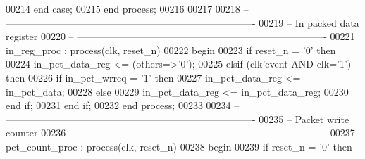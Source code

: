 \begin{DoxyCode}
00214     \textcolor{keywordflow}{end} \textcolor{keywordflow}{case};
00215 \textcolor{keywordflow}{end} \textcolor{keywordflow}{process};
00216 
00217 
00218 \textcolor{keyword}{-- ----------------------------------------------------------------------------}
00219 \textcolor{keyword}{-- In packed data register}
00220 \textcolor{keyword}{-- ----------------------------------------------------------------------------}
00221 in\_reg\_proc : \textcolor{keywordflow}{process}(clk, reset_n)
00222 \textcolor{vhdlkeyword}{begin}
00223    \textcolor{keywordflow}{if} \textcolor{vhdlchar}{reset_n} \textcolor{vhdlchar}{=} \textcolor{vhdlchar}{'}\textcolor{vhdllogic}{}\textcolor{vhdllogic}{0}\textcolor{vhdlchar}{'} \textcolor{keywordflow}{then} 
00224       \textcolor{vhdlchar}{in_pct_data_reg} \textcolor{vhdlchar}{<=} \textcolor{vhdlchar}{(}\textcolor{keywordflow}{others}\textcolor{vhdlchar}{=}\textcolor{vhdlchar}{>}\textcolor{vhdlchar}{'}\textcolor{vhdllogic}{}\textcolor{vhdllogic}{0}\textcolor{vhdlchar}{'}\textcolor{vhdlchar}{)};
00225    \textcolor{keywordflow}{elsif} \textcolor{vhdlchar}{(}\textcolor{vhdlchar}{clk}\textcolor{vhdlchar}{'}\textcolor{vhdlkeyword}{event} \textcolor{keywordflow}{AND} \textcolor{vhdlchar}{clk}\textcolor{vhdlchar}{=}\textcolor{vhdlchar}{'}\textcolor{vhdllogic}{}\textcolor{vhdllogic}{1}\textcolor{vhdlchar}{'}\textcolor{vhdlchar}{)} \textcolor{keywordflow}{then} 
00226       \textcolor{keywordflow}{if} \textcolor{vhdlchar}{in_pct_wrreq} \textcolor{vhdlchar}{=} \textcolor{vhdlchar}{'}\textcolor{vhdllogic}{}\textcolor{vhdllogic}{1}\textcolor{vhdlchar}{'} \textcolor{keywordflow}{then} 
00227          \textcolor{vhdlchar}{in_pct_data_reg} \textcolor{vhdlchar}{<=} \textcolor{vhdlchar}{in_pct_data};
00228       \textcolor{keywordflow}{else} 
00229          \textcolor{vhdlchar}{in_pct_data_reg} \textcolor{vhdlchar}{<=} \textcolor{vhdlchar}{in_pct_data_reg};
00230       \textcolor{keywordflow}{end} \textcolor{keywordflow}{if};
00231    \textcolor{keywordflow}{end} \textcolor{keywordflow}{if};
00232 \textcolor{keywordflow}{end} \textcolor{keywordflow}{process};
00233 
00234 \textcolor{keyword}{-- ----------------------------------------------------------------------------}
00235 \textcolor{keyword}{-- Packet write counter}
00236 \textcolor{keyword}{-- ----------------------------------------------------------------------------}
00237 pct\_count\_proc : \textcolor{keywordflow}{process}(clk, reset_n)
00238 \textcolor{vhdlkeyword}{begin}
00239    \textcolor{keywordflow}{if} \textcolor{vhdlchar}{reset_n} \textcolor{vhdlchar}{=} \textcolor{vhdlchar}{'}\textcolor{vhdllogic}{}\textcolor{vhdllogic}{0}\textcolor{vhdlchar}{'} \textcolor{keywordflow}{then} 

\end{DoxyCode}
